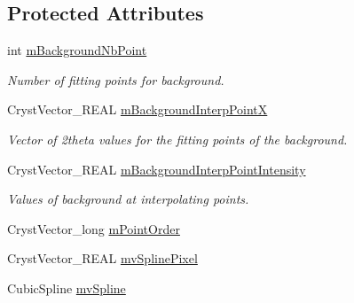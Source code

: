 \subsection*{Protected Attributes}
\begin{DoxyCompactItemize}
\item 
\mbox{\label{class_obj_cryst_1_1_powder_pattern_background_a1b41334ecbbbe337121f6041b7068e99}} 
int \mbox{\hyperlink{class_obj_cryst_1_1_powder_pattern_background_a1b41334ecbbbe337121f6041b7068e99}{m\+Background\+Nb\+Point}}
\begin{DoxyCompactList}\small\item\em Number of fitting points for background. \end{DoxyCompactList}\item 
\mbox{\label{class_obj_cryst_1_1_powder_pattern_background_a68740ba9e8c4348e2a6b2d96024436eb}} 
Cryst\+Vector\+\_\+\+R\+E\+AL \mbox{\hyperlink{class_obj_cryst_1_1_powder_pattern_background_a68740ba9e8c4348e2a6b2d96024436eb}{m\+Background\+Interp\+PointX}}
\begin{DoxyCompactList}\small\item\em Vector of 2theta values for the fitting points of the background. \end{DoxyCompactList}\item 
\mbox{\label{class_obj_cryst_1_1_powder_pattern_background_a942a33452d66e00cd155743a9c8c21e2}} 
Cryst\+Vector\+\_\+\+R\+E\+AL \mbox{\hyperlink{class_obj_cryst_1_1_powder_pattern_background_a942a33452d66e00cd155743a9c8c21e2}{m\+Background\+Interp\+Point\+Intensity}}
\begin{DoxyCompactList}\small\item\em Values of background at interpolating points. \end{DoxyCompactList}\item 
Cryst\+Vector\+\_\+long \mbox{\hyperlink{class_obj_cryst_1_1_powder_pattern_background_a1280a4f46ff6ba37182878507fab21f4}{m\+Point\+Order}}
\item 
Cryst\+Vector\+\_\+\+R\+E\+AL \mbox{\hyperlink{class_obj_cryst_1_1_powder_pattern_background_a16f3af868232f0bbe8c4884ec1676518}{mv\+Spline\+Pixel}}
\item 
Cubic\+Spline \mbox{\hyperlink{class_obj_cryst_1_1_powder_pattern_background_a671b5004d363af3cd7efbe97b488ac33}{mv\+Spline}}

\end{DoxyCompactItemize}
